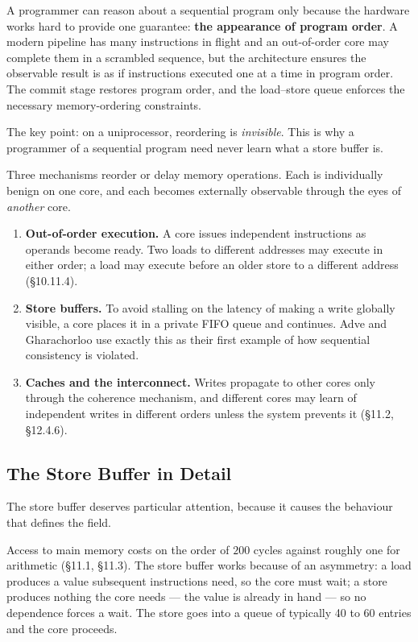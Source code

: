 A programmer can reason about a sequential program only because the hardware
works hard to provide one guarantee: \textbf{the appearance of program order}.
A modern pipeline has many instructions in flight and an out-of-order core may
complete them in a scrambled sequence, but the architecture ensures the
observable result is as if instructions executed one at a time in program order.
The commit stage restores program order, and the load--store queue enforces the
necessary memory-ordering constraints.

The key point: on a uniprocessor, reordering is \emph{invisible}.
This is why a programmer of a sequential program need never learn what a store
buffer is.

Three mechanisms reorder or delay memory operations.
Each is individually benign on one core, and each becomes externally observable
through the eyes of \emph{another} core.

\begin{enumerate}[leftmargin=*,itemsep=2pt]
\item \textbf{Out-of-order execution.} A core issues independent instructions as
  operands become ready. Two loads to different addresses may execute in either
  order; a load may execute before an older store to a different address
  (\S10.11.4).
\item \textbf{Store buffers.} To avoid stalling on the latency of making a write
  globally visible, a core places it in a private FIFO queue and continues.
  Adve and Gharachorloo \cite{adve1996shared} use exactly this as their first
  example of how sequential consistency is violated.
\item \textbf{Caches and the interconnect.} Writes propagate to other cores only
  through the coherence mechanism, and different cores may learn of independent
  writes in different orders unless the system prevents it (\S11.2, \S12.4.6).
\end{enumerate}

\subsection{The Store Buffer in Detail}

The store buffer deserves particular attention, because it causes the behaviour
that defines the field.

Access to main memory costs on the order of $200$ cycles against roughly one for
arithmetic (\S11.1, \S11.3).
The store buffer works because of an asymmetry: a load produces a value
subsequent instructions need, so the core must wait; a store produces nothing
the core needs --- the value is already in hand --- so no dependence forces a
wait.
The store goes into a queue of typically 40 to 60 entries and the core proceeds.

